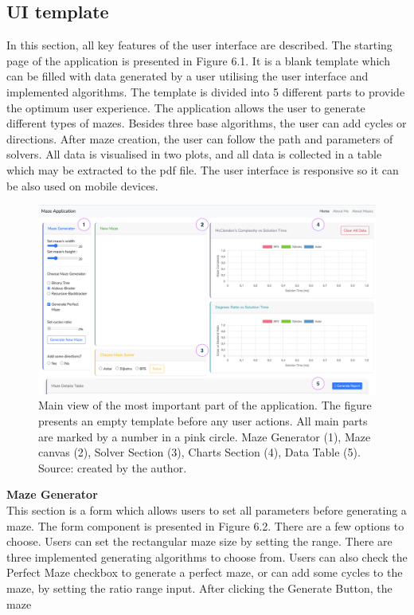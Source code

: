 \subsection{UI template}
In this section, all key features of the user interface are described. The starting page of the application is presented in Figure 6.1. It is a blank template which can be
filled with data generated by a user utilising the user interface and implemented algorithms. The template is divided into 5 different parts to provide the optimum
user experience. The application allows the user to generate different types of mazes. Besides three base algorithms, the user can add cycles or directions.
After maze creation, the user can follow the path and parameters of solvers. All data is visualised in two plots, and all data is collected in a table which may be extracted to
the pdf file. The user interface is responsive so it can be also used on mobile devices.
\begin{figure}[!h]
    \centering
    \includegraphics[width=0.9\linewidth]{templateView}
    \caption{Main view of the most important part of the application. The figure presents an empty template before any user actions. All main parts are 
    marked by a number in a pink circle. Maze Generator (1), Maze canvas (2), Solver Section (3), Charts Section (4), Data Table (5).\\ Source: created by the author.}
    \end{figure}
\newpage
\indent \textbf{Maze Generator}\\
\indent This section is a form which allows users to set all parameters before generating a maze. The form component is presented in Figure 6.2. There are a few options to
choose. Users can set the rectangular maze size by setting the range. There are three implemented generating algorithms to choose from. Users can also check the
Perfect Maze checkbox to generate a perfect maze, or can add some cycles to the maze, by setting the ratio range input. After clicking the Generate Button, the maze
